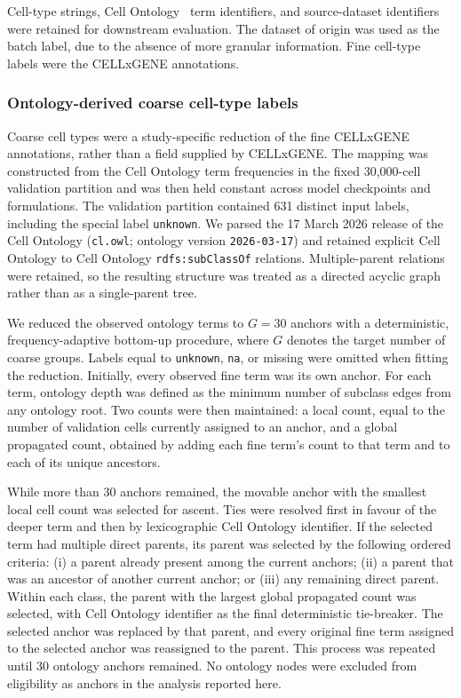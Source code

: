 \documentclass[pdflatex,sn-nature]{sn-jnl}%
\theoremstyle{thmstyleone}%
\theoremstyle{thmstyletwo}%
\theoremstyle{thmstylethree}%
\begin{document}
Cell-type strings, Cell Ontology~\cite{Bard2005} term identifiers, and source-dataset identifiers were retained for downstream evaluation.
The dataset of origin was used as the batch label, due to the absence of more granular information.
Fine cell-type labels were the CELLxGENE annotations.

\subsubsection{Ontology-derived coarse cell-type labels}
\label{sec:coarse}

Coarse cell types were a study-specific reduction of the fine CELLxGENE annotations, rather than a field supplied by CELLxGENE.
The mapping was constructed from the Cell Ontology term frequencies in the fixed 30,000-cell validation partition and was then held constant across model checkpoints and formulations.
The validation partition contained 631 distinct input labels, including the special label \texttt{unknown}.
We parsed the 17 March 2026 release of the Cell Ontology (\texttt{cl.owl}; ontology version \texttt{2026-03-17}) and retained explicit Cell Ontology to Cell Ontology \texttt{rdfs:subClassOf} relations.
Multiple-parent relations were retained, so the resulting structure was treated as a directed acyclic graph rather than as a single-parent tree.

We reduced the observed ontology terms to \(G=30\) anchors with a deterministic, frequency-adaptive bottom-up procedure, where \(G\) denotes the target number of coarse groups.
Labels equal to \texttt{unknown}, \texttt{na}, or missing were omitted when fitting the reduction.
Initially, every observed fine term was its own anchor.
For each term, ontology depth was defined as the minimum number of subclass edges from any ontology root.
Two counts were then maintained: a local count, equal to the number of validation cells currently assigned to an anchor, and a global propagated count, obtained by adding each fine term's count to that term and to each of its unique ancestors.

While more than 30 anchors remained, the movable anchor with the smallest local cell count was selected for ascent.
Ties were resolved first in favour of the deeper term and then by lexicographic Cell Ontology identifier.
If the selected term had multiple direct parents, its parent was selected by the following ordered criteria: (i) a parent already present among the current anchors; (ii) a parent that was an ancestor of another current anchor; or (iii) any remaining direct parent.
Within each class, the parent with the largest global propagated count was selected, with Cell Ontology identifier as the final deterministic tie-breaker.
The selected anchor was replaced by that parent, and every original fine term assigned to the selected anchor was reassigned to the parent.
This process was repeated until 30 ontology anchors remained.
No ontology nodes were excluded from eligibility as anchors in the analysis reported here.
\end{document}
